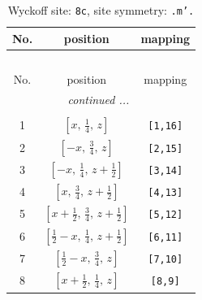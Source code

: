 \documentclass[fleqn,8pt]{jsarticle}
\begin{document}
\begin{longtable}{ccc}
\caption{Wyckoff site: {\tt 8c}, site symmetry: {\tt .m'.}}
 \\
 \hline \hline
No. & position & mapping \\ \hline \endfirsthead

\multicolumn{2}{l}{\tablename\ \thetable{}} \\
 \hline \hline
No. & position & mapping \\ \hline \endhead

 \hline \hline
\multicolumn{2}{r}{\footnotesize\it continued ...} \\ \endfoot

 \hline \hline
\multicolumn{2}{r}{} \\ \endlastfoot

1 & $\left[ x,\, \frac{1}{4},\, z \right]$ & {\tt [1,16]} \\ \hline
2 & $\left[ - x,\, \frac{3}{4},\, z \right]$ & {\tt [2,15]} \\ \hline
3 & $\left[ - x,\, \frac{1}{4},\, z + \frac{1}{2} \right]$ & {\tt [3,14]} \\ \hline
4 & $\left[ x,\, \frac{3}{4},\, z + \frac{1}{2} \right]$ & {\tt [4,13]} \\ \hline
5 & $\left[ x + \frac{1}{2},\, \frac{3}{4},\, z + \frac{1}{2} \right]$ & {\tt [5,12]} \\ \hline
6 & $\left[ \frac{1}{2} - x,\, \frac{1}{4},\, z + \frac{1}{2} \right]$ & {\tt [6,11]} \\ \hline
7 & $\left[ \frac{1}{2} - x,\, \frac{3}{4},\, z \right]$ & {\tt [7,10]} \\ \hline
8 & $\left[ x + \frac{1}{2},\, \frac{1}{4},\, z \right]$ & {\tt [8,9]} \\
\end{longtable}
\renewcommand{\arraystretch}{1.2}
\end{document}
